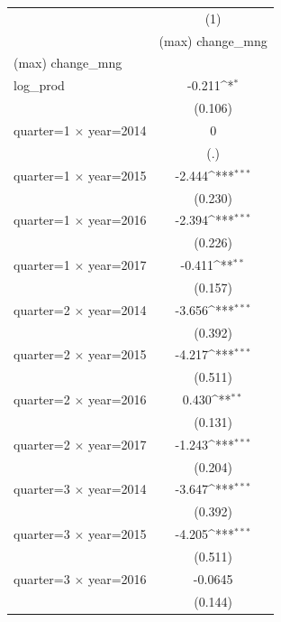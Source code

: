 {
\def\sym#1{\ifmmode^{#1}\else\(^{#1}\)\fi}
\begin{tabular}{l*{1}{c}}
\hline\hline
                    &\multicolumn{1}{c}{(1)}\\
                    &\multicolumn{1}{c}{(max) change\_mng}\\
\hline
(max) change\_mng    &                     \\
log\_prod            &      -0.211\sym{*}  \\
                    &     (0.106)         \\
[1em]
quarter=1 $\times$ year=2014&           0         \\
                    &         (.)         \\
[1em]
quarter=1 $\times$ year=2015&      -2.444\sym{***}\\
                    &     (0.230)         \\
[1em]
quarter=1 $\times$ year=2016&      -2.394\sym{***}\\
                    &     (0.226)         \\
[1em]
quarter=1 $\times$ year=2017&      -0.411\sym{**} \\
                    &     (0.157)         \\
[1em]
quarter=2 $\times$ year=2014&      -3.656\sym{***}\\
                    &     (0.392)         \\
[1em]
quarter=2 $\times$ year=2015&      -4.217\sym{***}\\
                    &     (0.511)         \\
[1em]
quarter=2 $\times$ year=2016&       0.430\sym{**} \\
                    &     (0.131)         \\
[1em]
quarter=2 $\times$ year=2017&      -1.243\sym{***}\\
                    &     (0.204)         \\
[1em]
quarter=3 $\times$ year=2014&      -3.647\sym{***}\\
                    &     (0.392)         \\
[1em]
quarter=3 $\times$ year=2015&      -4.205\sym{***}\\
                    &     (0.511)         \\
[1em]
quarter=3 $\times$ year=2016&     -0.0645         \\
                    &     (0.144)         \\

\end{tabular}}
